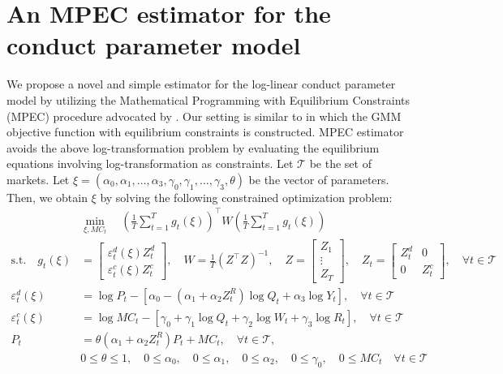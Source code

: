 \documentclass[11pt, a4paper]{article}
\begin{document}
\section{An MPEC estimator for the conduct parameter model}

We propose a novel and simple estimator for the log-linear conduct parameter model by utilizing the Mathematical Programming with Equilibrium Constraints (MPEC) procedure advocated by \cite{su2012constrained}. Our setting is similar to \cite{dube2012improving} in which the GMM objective function with equilibrium constraints is constructed. 
MPEC estimator avoids the above log-transformation problem by evaluating the equilibrium equations involving log-transformation as constraints.
Let $\mathcal{T}$ be the set of markets. Let $\xi = (\alpha_0,\alpha_1, \ldots, \alpha_3, \gamma_0,\gamma_1, \ldots, \gamma_3, \theta)$ be the vector of parameters. Then, we obtain $\xi$ by solving the following constrained optimization problem:
\begin{align}
    &\min_{\xi, MC_t}\quad \left(\frac{1}{T}\sum_{t=1}^{T}g_{t}(\xi)\right)^{\top} W\left(\frac{1}{T}\sum_{t=1}^{T}g_{t}(\xi)\right) \label{eq:objective_gmm}\\
    \text{s.t.}\quad g_{t}(\xi)&=\left[\begin{array}{l}
\varepsilon^{d}_{t}(\xi)Z_{t}^{d} \\
\varepsilon^{c}_{t}(\xi)Z_{t}^{c}
\end{array}\right], \quad W=\frac{1}{T}(Z^\top Z)^{-1}, \quad Z=\left[\begin{array}{c}
Z_{1} \\
\vdots \\
Z_{T}
\end{array}\right],\quad Z_{t}=\left[\begin{array}{ll}
Z_{t}^{d} & 0 \\
0 & Z_{t}^{c}
\end{array}\right],\quad  \forall t \in \mathcal{T}\nonumber\\
    \varepsilon^{d}_{t}(\xi)&=\log P_{t} -[\alpha_0 - (\alpha_1 + \alpha_2 Z^{R}_{t}) \log Q_t + \alpha_3 \log Y_t],\quad  \forall t \in \mathcal{T} \label{eq:demand_gmm}\\
    \varepsilon^{c}_{t} (\xi)&= \log MC_t -[\gamma_0 + \gamma_1 \log Q_t +  \gamma_2 \log W_{t} + \gamma_3 \log R_t],\quad  \forall t \in \mathcal{T}\label{eq:supply_gmm}\\
    P_t &= \theta (\alpha_1 + \alpha_2 Z^{R}_{t})P_t + MC_t,\quad  \forall t \in \mathcal{T},\label{eq:equilibrium_constraint}\\
    &0\le\theta \le 1,\quad  0 \le \alpha_0,\quad 0 \le \alpha_1, \quad 0 \le \alpha_2, \quad  0\le \gamma_0,\quad  0 \le MC_t  \quad  \forall t \in \mathcal{T}\label{eq:parameter_constraint}
\end{align}
\end{document}
